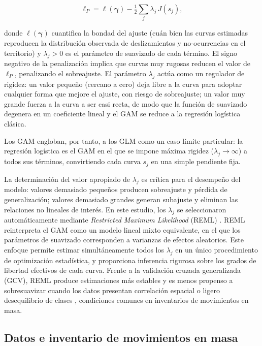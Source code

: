 \documentclass[12pt,a4paper]{article}
\begin{document}
\begin{equation}
    \ell_P = \ell(\boldsymbol{\gamma}) -
    \tfrac{1}{2}\sum_j \lambda_j\, J(s_j),
    \label{eq:plik}
\end{equation}

donde $\ell(\boldsymbol{\gamma})$ cuantifica la bondad del ajuste
(cuán bien las curvas estimadas reproducen la distribución observada
de deslizamientos y no-ocurrencias en el territorio) y
$\lambda_j > 0$ es el parámetro de suavizado de cada término.
El signo negativo de la penalización implica que curvas muy rugosas
reducen el valor de $\ell_P$, penalizando el sobreajuste. El
parámetro $\lambda_j$ actúa como un regulador de rigidez: un
valor pequeño (cercano a cero) deja libre a la curva para adoptar
cualquier forma que mejore el ajuste, con riesgo de sobreajuste; un
valor muy grande fuerza a la curva a ser casi recta, de modo que la
función de suavizado degenera en un coeficiente lineal y el GAM se
reduce a la regresión logística clásica. 

Los GAM engloban, por tanto,
a los GLM como un caso límite particular: la regresión logística es
el GAM en el que se impone máxima rigidez ($\lambda_j \to \infty$) a
todos sus términos, convirtiendo cada curva $s_j$ en una simple
pendiente fija.

La determinación del valor apropiado de $\lambda_j$ es crítica para el
desempeño del modelo: valores demasiado pequeños producen sobreajuste
y pérdida de generalización; valores demasiado grandes generan
subajuste y eliminan las relaciones no lineales de interés.
En este estudio, los $\lambda_j$ se seleccionaron automáticamente
mediante \textit{Restricted Maximum Likelihood} (REML)
\citep{wood2017generalized}. REML reinterpreta el GAM como un modelo
lineal mixto equivalente, en el que los parámetros de suavizado
corresponden a varianzas de efectos aleatorios. Este enfoque permite
estimar simultáneamente todos los $\lambda_j$ en un único procedimiento
de optimización estadística, y proporciona inferencia rigurosa sobre
los grados de libertad efectivos de cada curva. Frente a la validación
cruzada generalizada (GCV), REML produce estimaciones más estables y
es menos propenso a sobresuavizar cuando los datos presentan correlación
espacial o ligero desequilibrio de clases
\citep{wood2017generalized}, condiciones comunes en inventarios de
movimientos en masa.

\subsection{Datos e inventario de movimientos en masa}
\end{document}
